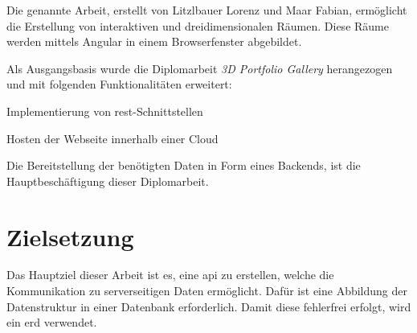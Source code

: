 
Die genannte Arbeit, erstellt von Litzlbauer Lorenz und Maar Fabian, 
ermöglicht die Erstellung von interaktiven und dreidimensionalen Räumen.
Diese Räume werden mittels Angular in einem Browserfenster abgebildet.

Als Ausgangsbasis wurde die Diplomarbeit \emph{3D Portfolio Gallery} herangezogen und mit folgenden Funktionalitäten erweitert:

\begin{compactitem}
    \item Implementierung von \gls{rest}-Schnittstellen 
    \item Hosten der Webseite innerhalb einer Cloud
\end{compactitem}

Die Bereitstellung der benötigten Daten in Form eines Backends, ist die Hauptbeschäftigung dieser Diplomarbeit. 


\section{Zielsetzung}

Das Hauptziel dieser Arbeit ist es, eine \Gls{api} zu erstellen, welche die Kommunikation zu serverseitigen Daten ermöglicht. 
Dafür ist eine Abbildung der Datenstruktur in einer Datenbank erforderlich. 
Damit diese fehlerfrei erfolgt, wird ein \Gls{erd} verwendet. 